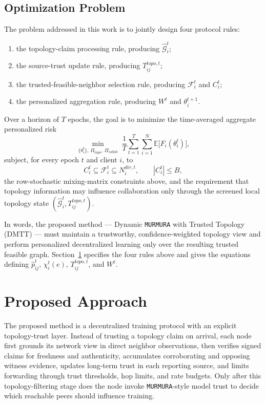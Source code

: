 \documentclass[journal]{IEEEtran}
\theoremstyle{definition}
\theoremstyle{remark}
\begin{document}
\subsection{Optimization Problem}

The problem addressed in this work is to jointly design four protocol rules:
\begin{enumerate}[leftmargin=2em,itemsep=0.2ex]
  \item the topology-claim processing rule, producing $\hat{\mathcal G}_i^t$;
  \item the source-trust update rule, producing $T_{ij}^{topo,t}$;
  \item the trusted-feasible-neighbor selection rule, producing $\mathcal F_i^t$ and $C_i^t$;
  \item the personalized aggregation rule, producing $W^t$ and $\theta_i^{t+1}$.
\end{enumerate}
Over a horizon of $T$ epochs, the goal is to minimize the time-averaged aggregate personalized risk
$$
\min_{\{\theta_i^t\},\,\Pi_{topo},\,\Pi_{collab}}\;
\frac{1}{T}\sum_{t=1}^{T}\sum_{i=1}^{N} \mathbb E\big[F_i(\theta_i^t)\big],
$$
subject, for every epoch $t$ and client $i$, to
$$
C_i^t \subseteq \mathcal F_i^t \subseteq N_i^{dir,t},\qquad |C_i^t|\le B,
$$
the row-stochastic mixing-matrix constraints above, and the requirement that topology information may influence collaboration only through the screened local topology state $(\hat{\mathcal G}_i^t, T_{ij}^{topo,t})$.

In words, the proposed method — Dynamic \texttt{MURMURA} with Trusted Topology (DMTT) — must maintain a trustworthy, confidence-weighted topology view and perform personalized decentralized learning only over the resulting trusted feasible graph. Section~\ref{sec:protocol} specifies the four rules above and gives the equations defining $\hat p_{ij}^t$, $\chi_i^t(e)$, $T_{ij}^{topo,t}$, and $W^t$.

\section{Proposed Approach}
\label{sec:protocol}

The proposed method is a decentralized training protocol with an explicit topology-trust layer. Instead of trusting a topology claim on arrival, each node first grounds its network view in direct neighbor observations, then verifies signed claims for freshness and authenticity, accumulates corroborating and opposing witness evidence, updates long-term trust in each reporting source, and limits forwarding through trust thresholds, hop limits, and rate budgets. Only after this topology-filtering stage does the node invoke \texttt{MURMURA}-style model trust to decide which reachable peers should influence training.
\end{document}
